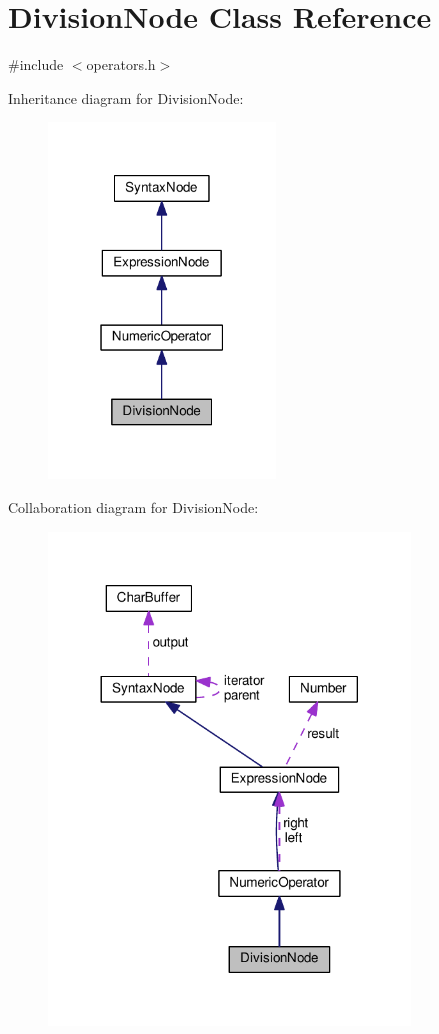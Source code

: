 \hypertarget{classDivisionNode}{}\section{Division\+Node Class Reference}
\label{classDivisionNode}


{\ttfamily \#include $<$operators.\+h$>$}



Inheritance diagram for Division\+Node\+:\nopagebreak
\begin{figure}[H]
\begin{center}
\leavevmode
\includegraphics[width=171pt]{classDivisionNode__inherit__graph}
\end{center}
\end{figure}


Collaboration diagram for Division\+Node\+:\nopagebreak
\begin{figure}[H]
\begin{center}
\leavevmode
\includegraphics[width=272pt]{classDivisionNode__coll__graph}
\end{center}
\end{figure}
